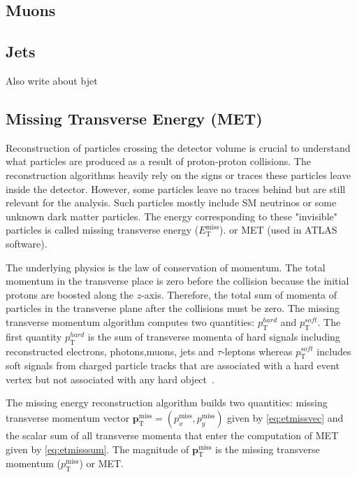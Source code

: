 \subsection*{Muons}
\subsection*{Jets}
Also write about bjet

\subsection{Missing Transverse Energy (MET)}
Reconstruction of particles crossing the detector volume is crucial to understand what particles
are produced as a result of proton-proton collisions. The reconstruction algorithms heavily rely on the
signs or traces these particles leave inside the detector. However, some particles leave no traces
behind but are still relevant for the analysis. Such particles mostly include SM neutrinos or some unknown dark matter
particles. The energy corresponding to these "invisible" particles is called missing transverse energy ($E_{\text{T}}^{\text{miss}}$).
or MET (used in ATLAS software).

The underlying physics is the law of conservation of momentum. The total momentum in the transverse place is zero before the collision because 
the initial protons are boosted along the $z$-axis. Therefore, the total sum of momenta of particles in the transverse plane after the collisions must be zero. 
The missing transverse momentum algorithm computes two quantities: $p_{\text{T}}^{hard}$ and $p_{\text{T}}^{soft}$. The first quantity $p_{\text{T}}^{hard}$ 
is the sum of transverse momenta of hard signals including reconstructed electrons, photons,muons, jets and $\tau$-leptons whereas $p_{\text{T}}^{soft}$ includes
soft signals from charged particle tracks that are associated with a hard event vertex but not associated with any hard object~\cite{ATLAS:2024cmj}. 

The missing energy reconstruction algorithm builds two quantities: missing transverse momentum vector $\boldsymbol{p}_{\text{T}}^{\text{miss}} = (p_x^{\text{miss}},p_y^{\text{miss}})$ 
given by \cref{eq:etmissvec} and the scalar sum of all transverse momenta that enter the computation of MET
given by \cref{eq:etmisssum}. The magnitude of $\boldsymbol{p}_{\text{T}}^{\text{miss}}$ is the missing transverse momentum ($p_{\text{T}}^{\text{miss}}$) or
MET. 

